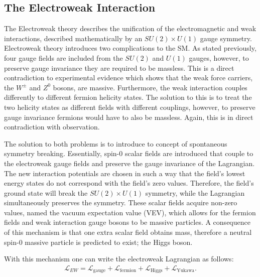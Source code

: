 \subsection{The Electroweak Interaction}
\label{subsec:EWInteraction}
The Electroweak theory \cite{glashow1959renormalizability} describes the unification of the electromagnetic and weak interactions, described mathematically by an $SU(2) \times U(1)$ gauge symmetry.
Electroweak theory introduces two complications to the SM.
As stated previously, four gauge fields are included from the $SU(2)$ and $U(1)$ gauges, however, to preserve gauge invariance they are required to be massless.
This is a direct contradiction to experimental evidence which shows that the weak force carriers, the $W^{\pm}$ and $Z^{0}$ bosons, are massive.
Furthermore, the weak interaction couples differently to different fermion helicity states.
The solution to this is to treat the two helicity states as different fields with different couplings, however, to preserve gauge invariance fermions would have to also be massless.
Again, this is in direct contradiction with observation.

The solution to both problems is to introduce to concept of spontaneous symmetry breaking. 
Essentially, spin-0 scalar fields are introduced that couple to the electroweak gauge fields and preserve the gauge invariance of the Lagrangian.
The new interaction potentials are chosen in such a way that the field's lowest energy states do not correspond with the field's zero values.
Therefore, the field's ground state will break the $SU(2) \times U(1)$ symmetry, while the Lagrangian simultaneously preserves the symmetry.
These scalar fields acquire non-zero values, named the vacuum expectation value (VEV), which allows for the fermion fields and weak interaction gauge bosons to be massive particles.
A consequence of this mechanism is that one extra scalar field obtains mass, therefore a neutral spin-0 massive particle is predicted to exist; the Higgs boson.

With this mechanism one can write the electroweak Lagrangian as follows:
\begin{align}
\mathcal{L}_{EW} = \mathcal{L}_{\textrm{gauge}} + \mathcal{L}_{\textrm{fermion}} + \mathcal{L}_{\textrm{Higgs}} + \mathcal{L}_{\textrm{Yukawa}}.
\end{align}

